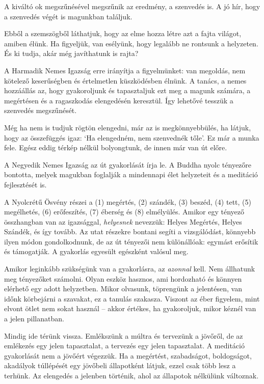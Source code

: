 
A kiváltó ok megszűnésével megszűnik az eredmény, a szenvedés is. A jó
hír, hogy a szenvedés végét is magunkban találjuk.

Ebből a szemszögből láthatjuk, hogy az elme hozza létre azt a fajta
világot, amiben élünk. Ha figyeljük, van esélyünk, hogy legalább ne
rontsunk a helyzeten. És ki tudja, akár még javíthatunk is rajta?

A Harmadik Nemes Igazság erre irányítja a figyelmünket: van megoldás,
nem kötelező keserűségben és értelmetlen küszködésben élnünk. A tanács,
a nemes hozzáállás az, hogy gyakoroljunk és tapasztaljuk ezt meg a
magunk számára, a megértésen és a ragaszkodás elengedésén keresztül. Így
lehetővé tesszük a szenvedés megszűnését.

Még ha nem is tudjuk rögtön elengedni, már az is megkönnyebbülés, ha
látjuk, hogy az összefüggés igaz: `Ha elengedném, nem szenvednék tőle'.
Ez már a munka fele. Egész eddig térkép nélkül bolyongtunk, de innen már
van út előre.


A Negyedik Nemes Igazság az út gyakorlását írja le. A Buddha nyolc
tényezőre bontotta, melyek magukban foglalják a mindennapi élet
helyzeteit és a meditáció fejlesztését is.

A Nyolcrétű Ösvény részei a (1) megértés, (2) szándék, (3) beszéd, (4)
tett, (5) megélhetés, (6) erőfeszítés, (7) éberség és (8) elmélyülés.
Amikor egy tényező összhangban van az igazsággal, \emph{helyesnek}
nevezzük: Helyes Megértés, Helyes Szándék, és így tovább. Az utat
részekre bontani segíti a vizsgálódást, könnyebb ilyen módon
gondolkodnunk, de az út tényezői nem különállóak: egymást erősítik és
támogatják. A gyakorlás egyesült egészként valósul meg.

Amikor leginkább szükségünk van a gyakorlásra, az \emph{azonnal} kell.
Nem állhatunk meg tényezőket számolni. Olyan eszköz hasznos, ami
hordozható és könnyen elérhető egy adott helyzetben. Mikor olvasunk,
töprengünk a jelentésen, van időnk körbejárni a szavakat, ez a tanulás
szakasza. Viszont az éber figyelem, mint elvont ötlet nem sokat használ
-- akkor értékes, ha gyakoroljuk, mikor kéznél van a jelen pillanatban.

Mindig ide térünk vissza. Emlékszünk a múltra és tervezünk a jövőről, de
az emlékezés egy jelen tapasztalat, a tervezés egy jelen tapasztalat. A
meditáció gyakorlását nem a jövőért végezzük. Ha a megértést,
szabadságot, boldogságot, akadályok túllépését egy jövőbeli állapotként
látjuk, ezzel csak több lesz a terhünk. Az elengedés a jelenben
történik, ahol az állapotok nélkülünk változnak.
